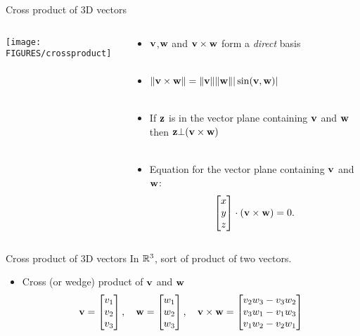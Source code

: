\documentclass[8pt,dvipsnames]{beamer}
\begin{document}
\begin{frame}{Cross product of 3D vectors}
  \begin{columns}
    \begin{column}{0.5\textwidth}
       \texttt{[image: FIGURES/crossproduct]}
     \end{column}
     \begin{column}{0.5\textwidth}
       \begin{itemize}
       \item ${\bf v}$,${\bf w}$ and ${\bf v}\times{\bf w}$ form a \emph{direct} basis~\\~\\
         \vfill
       \item $\|{\bf v}\times{\bf w}\| = \|{\bf v}\|\|{\bf w}\||\sin({\bf v},{\bf w})|$~\\~\\
       \item If ${\bf z}$ is in the vector plane containing  ${\bf v}$ and ${\bf w}$ then ${\bf z} \bot({\bf v}\times{\bf w})$~\\~\\
       \item Equation for the vector plane containing ${\bf v}$ and ${\bf w}$:
         $$
         \begin{bmatrix}
           x\\y\\z
         \end{bmatrix}\cdot({\bf v}\times{\bf w}) = 0.
         $$
       \end{itemize}
     \end{column}
  \end{columns}
\end{frame}

\begin{frame}{Cross product of 3D vectors}
  In ${\mathbb R}^3$, sort of  product of two vectors.\vfill
  \begin{itemize}[<+->]
  \item Cross (or wedge) product of ${\bf v}$ and ${\bf w}$
    $$
    {\bf v} =
    \begin{bmatrix}
      v_1\\v_2\\v_3
    \end{bmatrix},\quad {\bf w} = 
    \begin{bmatrix}
      w_1\\w_2 \\ w_3
    \end{bmatrix},\quad
    {\bf v}\times {\bf w} =
    \begin{bmatrix}
      v_2 w_3 - v_3 w_2\\
      v_3 w_1 - v_1 w_3\\
      v_1 w_2 - v_2 w_1
    \end{bmatrix}
    $$\vfill
  \end{itemize}
\end{frame}
  
\end{document}
